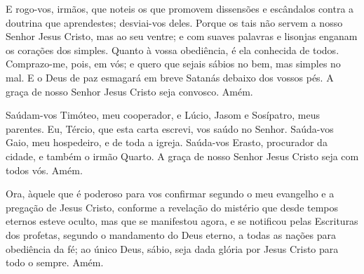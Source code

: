 E rogo-vos, irmãos, que noteis os que promovem dissensões e
escândalos contra a doutrina que aprendestes; desviai-vos deles.
Porque os tais não servem a nosso Senhor Jesus Cristo, mas ao
seu ventre; e com suaves palavras e lisonjas enganam os corações dos
simples. Quanto à vossa obediência, é ela conhecida de todos.
Comprazo-me, pois, em vós; e quero que sejais sábios no bem, mas
simples no mal. E o Deus de paz esmagará em breve Satanás
debaixo dos vossos pés. A graça de nosso Senhor Jesus Cristo seja
convosco. Amém.

Saúdam-vos Timóteo, meu cooperador, e Lúcio, Jasom e Sosípatro,
meus parentes. Eu, Tércio, que esta carta escrevi, vos saúdo
no Senhor. Saúda-vos Gaio, meu hospedeiro, e de toda a
igreja. Saúda-vos Erasto, procurador da cidade, e também o irmão
Quarto. A graça de nosso Senhor Jesus Cristo seja com todos
vós. Amém.

Ora, àquele que é poderoso para vos confirmar segundo o meu
evangelho e a pregação de Jesus Cristo, conforme a revelação do
mistério que desde tempos eternos esteve oculto, mas que se
manifestou agora, e se notificou pelas Escrituras dos profetas,
segundo o mandamento do Deus eterno, a todas as nações para
obediência da fé; ao único Deus, sábio, seja dada glória por
Jesus Cristo para todo o sempre. Amém.

